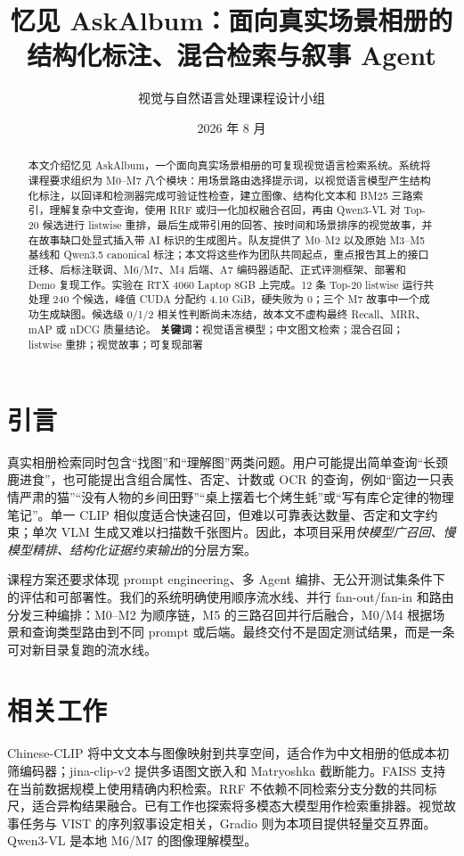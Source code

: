 \documentclass[UTF8,11pt,a4paper]{ctexart}
\title{忆见 AskAlbum：面向真实场景相册的\\结构化标注、混合检索与叙事 Agent}
\author{视觉与自然语言处理课程设计小组}
\date{2026 年 8 月}
\begin{document}
\maketitle
\begin{abstract}
本文介绍忆见 AskAlbum，一个面向真实场景相册的可复现视觉语言检索系统。系统将课程要求组织为 M0--M7 八个模块：用场景路由选择提示词，以视觉语言模型产生结构化标注，以回译和检测器完成可验证性检查，建立图像、结构化文本和 BM25 三路索引，理解复杂中文查询，使用 RRF 或归一化加权融合召回，再由 Qwen3-VL 对 Top-20 候选进行 listwise 重排，最后生成带引用的回答、按时间和场景排序的视觉故事，并在故事缺口处显式插入带 AI 标识的生成图片。队友提供了 M0--M2 以及原始 M3--M5 基线和 Qwen3.5 canonical 标注；本文将这些作为团队共同起点，重点报告其上的接口迁移、后标注联调、M6/M7、M4 后端、A7 编码器适配、正式评测框架、部署和 Demo 复现工作。实验在 RTX 4060 Laptop 8GB 上完成。12 条 Top-20 listwise 运行共处理 240 个候选，峰值 CUDA 分配约 4.10 GiB，硬失败为 0；三个 M7 故事中一个成功生成缺图。候选级 0/1/2 相关性判断尚未冻结，故本文不虚构最终 Recall、MRR、mAP 或 nDCG 质量结论。
\noindent\textbf{关键词：}视觉语言模型；中文图文检索；混合召回；listwise 重排；视觉故事；可复现部署
\end{abstract}
\noindent{}
\section{引言}
真实相册检索同时包含“找图”和“理解图”两类问题。用户可能提出简单查询“长颈鹿进食”，也可能提出含组合属性、否定、计数或 OCR 的查询，例如“窗边一只表情严肃的猫”“没有人物的乡间田野”“桌上摆着七个烤生蚝”或“写有库仑定律的物理笔记”。单一 CLIP 相似度适合快速召回，但难以可靠表达数量、否定和文字约束；单次 VLM 生成又难以扫描数千张图片。因此，本项目采用\emph{快模型广召回、慢模型精排、结构化证据约束输出}的分层方案。

课程方案还要求体现 prompt engineering、多 Agent 编排、无公开测试集条件下的评估和可部署性。我们的系统明确使用顺序流水线、并行 fan-out/fan-in 和路由分发三种编排：M0--M2 为顺序链，M5 的三路召回并行后融合，M0/M4 根据场景和查询类型路由到不同 prompt 或后端。最终交付不是固定测试结果，而是一条可对新目录复跑的流水线。
\section{相关工作}
Chinese-CLIP 将中文文本与图像映射到共享空间，适合作为中文相册的低成本初筛编码器\citep{chineseclip2022}；jina-clip-v2 提供多语图文嵌入和 Matryoshka 截断能力\citep{jinaclipv2}。FAISS 支持在当前数据规模上使用精确内积检索\citep{faiss2017}。RRF 不依赖不同检索分支分数的共同标尺，适合异构结果融合\citep{rrf2009}。已有工作也探索将多模态大模型用作检索重排器\citep{ragvl}。视觉故事任务与 VIST 的序列叙事设定相关\citep{vist2016}，Gradio 则为本项目提供轻量交互界面\citep{gradio}。Qwen3-VL 是本地 M6/M7 的图像理解模型\citep{qwen3vl}。
\end{document}
